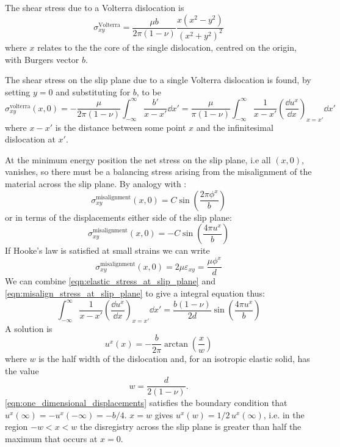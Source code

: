 The shear stress due to a Volterra dislocation  is \cite{hirth_lothe1982peierls_displacements}
\begin{equation}
\sigma^{\text{Volterra}}_{xy} = \frac{\mu b}{2\pi (1-\nu)} \frac{x(x^2 - y^2)}{(x^2+y^2)^2}
\end{equation}
where $x$ relates to the the core of the single dislocation, centred on the origin, with Burgers vector $b$.

The shear stress on the slip plane due to a single Volterra dislocation is found, by setting $y=0$ and substituting for $b$, to be
\begin{equation}
\sigma^{\text{volterra}}_{xy}(x,0) = -\frac{\mu}{2\pi(1-\nu)} \int^{\infty}_{-\infty} \frac{b'}{x-x'} \!\dd x' =  \frac{\mu}{\pi(1-\nu)} \int^{\infty}_{-\infty} \frac{1}{x-x'} \left(\!\frac{\dd u^x}{\dd x}\right)_{x=x'} \!\dd x'
\label{eqn:elastic_stress_at_slip_plane}
\end{equation}
where $x-x'$ is the distance between some point $x$ and the infinitesimal dislocation at $x'$.

At the minimum energy position the net stress on the slip plane, i.e all $(x,0)$, vanishes, so there must be a balancing stress arising from the misalignment of the material across the slip plane. By analogy with \citet{Frenkel1926}:
\begin{equation}
\sigma_{xy}^{\text{misalignment}}(x,0) = C \sin \left( \frac{2\pi \phi^x}{b} \right)
\end{equation}
or in terms of the displacements either side of the slip plane:
\begin{equation}
\sigma_{xy}^{\text{misalignment}}(x,0) = -C \sin \left( \frac{4\pi u^x}{b} \right)
\end{equation}
If Hooke's law is satisfied at small strains we can write
\begin{equation}
\sigma_{xy}^{\text{misalignment}}(x,0) = 2 \mu \varepsilon_{xy} = \frac{\mu{}\phi^x}{d}
\label{eqn:misalign_stress_at_slip_plane}
\end{equation}
We can combine \autoref{eqn:elastic_stress_at_slip_plane} and \autoref{eqn:misalign_stress_at_slip_plane} to give a integral equation thus:
\begin{equation}
\int^{\infty}_{-\infty} \frac{1}{x-x'} \left(\!\frac{\dd u^x}{\dd x}\right)_{x=x'} \dd x' = \frac{b(1-\nu)}{2d} \sin\left(\frac{4\pi{}u^x}{b}\right)
\end{equation}
A solution is \cite{hirth_lothe1982peierls_displacements, Eshelby1949}
\begin{equation}
u^x(x) = -\frac{b}{2\pi} \arctan \left( \frac{x}{w} \right)
\label{eqn:one_dimensional_displacements}
\end{equation}
where $w$ is the half width of the dislocation and, for an isotropic elastic solid, has the value
\begin{equation}
w = \frac{d}{2(1-\nu)}.\label{eqn:half_width}
\end{equation}
\autoref{eqn:one_dimensional_displacements} satisfies the boundary condition that $u^x(\infty) = - u^x(-\infty) = -b/4$. $x=w$ gives $u^x(w)=1/2\, u^x(\infty)$, i.e. in the region $-w < x < w$ the disregistry across the slip plane is greater than half the maximum that occurs at $x=0$.

